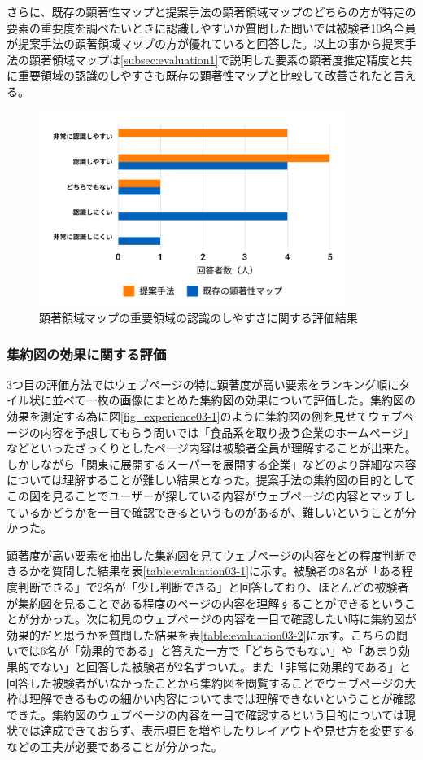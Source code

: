 \par さらに、既存の顕著性マップと提案手法の顕著領域マップのどちらの方が特定の要素の重要度を調べたいときに認識しやすいか質問した問いでは被験者10名全員が提案手法の顕著領域マップの方が優れていると回答した。以上の事から提案手法の顕著領域マップは\ref{subsec:evaluation1}で説明した要素の顕著度推定精度と共に重要領域の認識のしやすさも既存の顕著性マップと比較して改善されたと言える。

\begin{figure}[H]
    \centering
    \includegraphics[width=10cm]{figures/07_result01.jpg}
    \caption{顕著領域マップの重要領域の認識のしやすさに関する評価結果}
    \label{fig_evaluation02-1}
\end{figure}

\subsubsection{集約図の効果に関する評価}
\par 3つ目の評価方法ではウェブページの特に顕著度が高い要素をランキング順にタイル状に並べて一枚の画像にまとめた集約図の効果について評価した。集約図の効果を測定する為に図\ref{fig_experience03-1}のように集約図の例を見せてウェブページの内容を予想してもらう問いでは「食品系を取り扱う企業のホームページ」などといったざっくりとしたページ内容は被験者全員が理解することが出来た。しかしながら「関東に展開するスーパーを展開する企業」などのより詳細な内容については理解することが難しい結果となった。提案手法の集約図の目的としてこの図を見ることでユーザーが探している内容がウェブページの内容とマッチしているかどうかを一目で確認できるというものがあるが、難しいということが分かった。

\par 顕著度が高い要素を抽出した集約図を見てウェブページの内容をどの程度判断できるかを質問した結果を表\ref{table:evaluation03-1}に示す。被験者の8名が「ある程度判断できる」で2名が「少し判断できる」と回答しており、ほとんどの被験者が集約図を見ることである程度のページの内容を理解することができるということが分かった。次に初見のウェブページの内容を一目で確認したい時に集約図が効果的だと思うかを質問した結果を表\ref{table:evaluation03-2}に示す。こちらの問いでは6名が「効果的である」と答えた一方で「どちらでもない」や「あまり効果的でない」と回答した被験者が2名ずついた。また「非常に効果的である」と回答した被験者がいなかったことから集約図を閲覧することでウェブページの大枠は理解できるものの細かい内容についてまでは理解できないということが確認できた。集約図のウェブページの内容を一目で確認するという目的については現状では達成できておらず、表示項目を増やしたりレイアウトや見せ方を変更するなどの工夫が必要であることが分かった。

